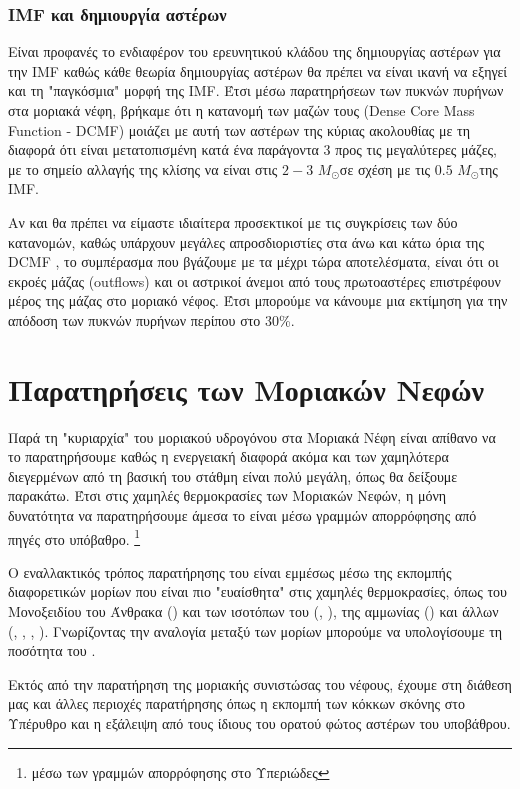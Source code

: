 \documentclass[a4paper,12pt]{memoir}
\newcommand{\sm}{$M_{\odot}$}
\begin{document}
\subsubsection{IMF και δημιουργία αστέρων}
Είναι προφανές το ενδιαφέρον του ερευνητικού κλάδου της δημιουργίας αστέρων για την IMF καθώς κάθε θεωρία δημιουργίας αστέρων θα πρέπει να είναι ικανή να εξηγεί και τη "παγκόσμια" μορφή της IMF.
Έτσι μέσω παρατηρήσεων των πυκνών πυρήνων στα μοριακά νέφη, βρήκαμε ότι η κατανομή των μαζών τους (Dense Core Mass Function - DCMF) μοιάζει με αυτή των αστέρων της κύριας ακολουθίας με τη διαφορά ότι είναι μετατοπισμένη κατά ένα παράγοντα $3$ προς τις μεγαλύτερες μάζες, με το σημείο αλλαγής της κλίσης να είναι στις $2-3$ \sm σε σχέση με τις $0.5$ \sm της IMF. 

Αν και θα πρέπει να είμαστε ιδιαίτερα προσεκτικοί με τις συγκρίσεις των δύο κατανομών, καθώς υπάρχουν μεγάλες απροσδιοριστίες στα άνω και κάτω όρια της DCMF \cite{polychroni__2010}, το συμπέρασμα που βγάζουμε με τα μέχρι τώρα αποτελέσματα, είναι ότι οι εκροές μάζας (outflows) και οι αστρικοί άνεμοι από τους πρωτοαστέρες επιστρέφουν μέρος της μάζας στο μοριακό νέφος. Έτσι μπορούμε να κάνουμε μια εκτίμηση για την απόδοση των πυκνών πυρήνων περίπου στο 30\%.


\section{Παρατηρήσεις των Μοριακών Νεφών}
\label{par:H2}
Παρά τη "κυριαρχία" του μοριακού υδρογόνου στα Μοριακά Νέφη είναι απίθανο να το παρατηρήσουμε καθώς η ενεργειακή διαφορά ακόμα και των χαμηλότερα διεγερμένων από τη βασική του στάθμη είναι πολύ μεγάλη, όπως θα δείξουμε παρακάτω. Έτσι στις χαμηλές θερμοκρασίες των Μοριακών Νεφών, η μόνη δυνατότητα να παρατηρήσουμε άμεσα το  είναι μέσω γραμμών απορρόφησης από πηγές στο υπόβαθρο. \footnote{μέσω των γραμμών απορρόφησης στο Υπεριώδες} 

Ο εναλλακτικός τρόπος παρατήρησης του  είναι εμμέσως μέσω της εκπομπής διαφορετικών μορίων που είναι πιο "ευαίσθητα" στις χαμηλές θερμοκρασίες, όπως του Μονοξειδίου του Άνθρακα () και των ισοτόπων του (, ), της αμμωνίας () και άλλων (, , , ).
Γνωρίζοντας την αναλογία μεταξύ των μορίων μπορούμε να υπολογίσουμε τη ποσότητα του .

Εκτός από την παρατήρηση της μοριακής συνιστώσας του νέφους, έχουμε στη διάθεση μας και άλλες περιοχές παρατήρησης όπως η εκπομπή των κόκκων σκόνης στο Υπέρυθρο και η εξάλειψη από τους ίδιους του ορατού φώτος αστέρων του υποβάθρου.
\end{document}
